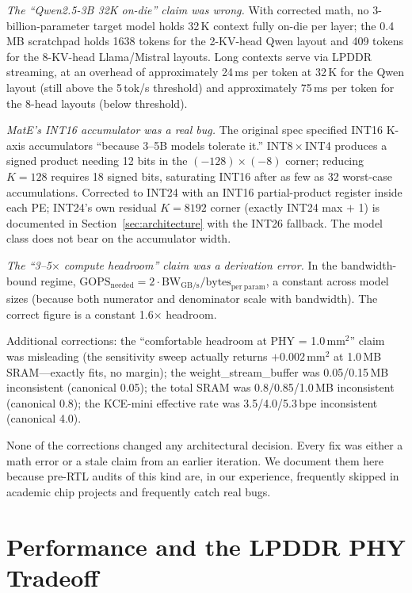 \documentclass[conference]{IEEEtran}
\begin{document}
\textit{The ``Qwen2.5-3B 32K on-die'' claim was wrong.} With corrected math, no 3-billion-parameter target model holds 32\,K context fully on-die per layer; the 0.4\,MB scratchpad holds 1638 tokens for the 2-KV-head Qwen layout and 409 tokens for the 8-KV-head Llama/Mistral layouts. Long contexts serve via LPDDR streaming, at an overhead of approximately 24\,ms per token at 32\,K for the Qwen layout (still above the 5\,tok/s threshold) and approximately 75\,ms per token for the 8-head layouts (below threshold).

\textit{MatE's INT16 accumulator was a real bug.} The original spec specified INT16 K-axis accumulators ``because 3--5B models tolerate it.'' INT8\,$\times$\,INT4 produces a signed product needing 12 bits in the $(-128)\times(-8)$ corner; reducing $K{=}128$ requires 18 signed bits, saturating INT16 after as few as 32 worst-case accumulations. Corrected to INT24 with an INT16 partial-product register inside each PE; INT24's own residual $K{=}8192$ corner (exactly INT24 max $+$ 1) is documented in Section~\ref{sec:architecture} with the INT26 fallback. The model class does not bear on the accumulator width.

\textit{The ``3--5$\times$ compute headroom'' claim was a derivation error.} In the bandwidth-bound regime, $\mathrm{GOPS}_{\mathrm{needed}} = 2 \cdot \mathrm{BW}_{\mathrm{GB/s}} / \mathrm{bytes}_{\mathrm{per\ param}}$, a constant across model sizes (because both numerator and denominator scale with bandwidth). The correct figure is a constant 1.6$\times$ headroom.

Additional corrections: the ``comfortable headroom at PHY = 1.0\,mm$^2$'' claim was misleading (the sensitivity sweep actually returns $+0.002$\,mm$^2$ at 1.0\,MB SRAM---exactly fits, no margin); the weight\_stream\_buffer was 0.05/0.15\,MB inconsistent (canonical 0.05); the total SRAM was 0.8/0.85/1.0\,MB inconsistent (canonical 0.8); the KCE-mini effective rate was 3.5/4.0/5.3\,bpe inconsistent (canonical 4.0).

None of the corrections changed any architectural decision. Every fix was either a math error or a stale claim from an earlier iteration. We document them here because pre-RTL audits of this kind are, in our experience, frequently skipped in academic chip projects and frequently catch real bugs.

\section{Performance and the LPDDR PHY Tradeoff}
\label{sec:performance}
\end{document}
